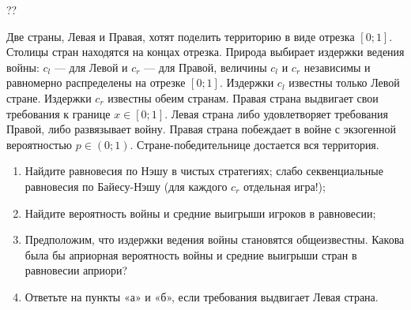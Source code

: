 \begin{problem}\par
\begin{source} \cite{slanthcev:gt}?? \end{source}
Две страны, Левая и Правая, хотят поделить территорию в виде отрезка  $\left[0;1\right]$. Столицы стран находятся на концах отрезка. Природа выбирает издержки ведения войны:  $c_{l} $  — для Левой и  $c_{r} $  — для Правой, величины  $c_{l} $  и  $c_{r} $  независимы и равномерно распределены на отрезке  $\left[0;1\right]$. Издержки  $c_{l} $  известны только Левой стране. Издержки  $c_{r} $  известны обеим странам. Правая страна выдвигает свои требования к границе  $x\in \left[0;1\right]$. Левая страна либо удовлетворяет требования Правой, либо развязывает войну. Правая страна побеждает в войне с экзогенной вероятностью  $p\in \left(0;1\right)$. Стране-победительнице достается вся территория.\par
\begin{enumerate}
\item      Найдите равновесия по Нэшу в чистых стратегиях; слабо секвенциальные равновесия по Байесу-Нэшу ({\red для каждого $c_r$ отдельная игра!});\par
\item      Найдите вероятность войны и средние выигрыши игроков в равновесии;\par
\item       Предположим, что издержки ведения войны становятся общеизвестны. Какова была бы {\red априорная} вероятность войны и средние выигрыши стран в равновесии {\red априори}? \par
\item      Ответьте на пункты «а» и «б», если требования выдвигает Левая страна.
\end{enumerate}


\begin{sol}

\end{sol}
\end{problem}



